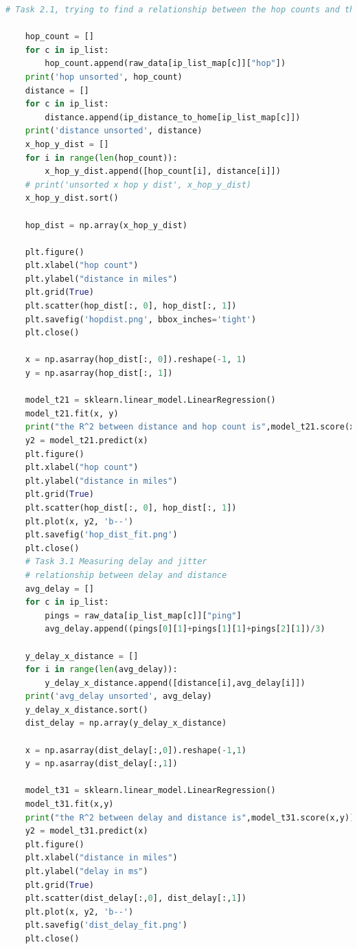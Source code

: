 \documentclass[paper=a4, fontsize=10pt]{scrartcl} %
\numberwithin{equation}{section} %
\numberwithin{figure}{section} %
\numberwithin{table}{section} %
\begin{document}
\begin{lstlisting}[language = python]
    # Task 2.1, trying to find a relationship between the hop counts and the geo distance
    
    hop_count = []
    for c in ip_list:
        hop_count.append(raw_data[ip_list_map[c]]["hop"])
    print('hop unsorted', hop_count)
    distance = []
    for c in ip_list:
        distance.append(ip_distance_to_home[ip_list_map[c]])
    print('distance unsorted', distance)
    x_hop_y_dist = []
    for i in range(len(hop_count)):
        x_hop_y_dist.append([hop_count[i], distance[i]])
    # print('unsorted x hop y dist', x_hop_y_dist)
    x_hop_y_dist.sort()
    
    hop_dist = np.array(x_hop_y_dist)
    
    plt.figure()
    plt.xlabel("hop count")
    plt.ylabel("distance in miles")
    plt.grid(True)
    plt.scatter(hop_dist[:, 0], hop_dist[:, 1])
    plt.savefig('hopdist.png', bbox_inches='tight')
    plt.close()
    
    x = np.asarray(hop_dist[:, 0]).reshape(-1, 1)
    y = np.asarray(hop_dist[:, 1])
    
    model_t21 = sklearn.linear_model.LinearRegression()
    model_t21.fit(x, y)
    print("the R^2 between distance and hop count is",model_t21.score(x, y))
    y2 = model_t21.predict(x)
    plt.figure()
    plt.xlabel("hop count")
    plt.ylabel("distance in miles")
    plt.grid(True)
    plt.scatter(hop_dist[:, 0], hop_dist[:, 1])
    plt.plot(x, y2, 'b--')
    plt.savefig('hop_dist_fit.png')
    plt.close()
    # Task 3.1 Measuring delay and jitter
    # relationship between delay and distance
    avg_delay = []
    for c in ip_list:
        pings = raw_data[ip_list_map[c]]["ping"]
        avg_delay.append((pings[0][1]+pings[1][1]+pings[2][1])/3)
    
    y_delay_x_distance = []
    for i in range(len(avg_delay)):
        y_delay_x_distance.append([distance[i],avg_delay[i]])
    print('avg_delay unsorted', avg_delay)
    y_delay_x_distance.sort()
    dist_delay = np.array(y_delay_x_distance)
    
    x = np.asarray(dist_delay[:,0]).reshape(-1,1)
    y = np.asarray(dist_delay[:,1])
    
    model_t31 = sklearn.linear_model.LinearRegression()
    model_t31.fit(x,y)
    print("the R^2 between delay and distance is",model_t31.score(x,y))
    y2 = model_t31.predict(x)
    plt.figure()
    plt.xlabel("distance in miles")
    plt.ylabel("delay in ms")
    plt.grid(True)
    plt.scatter(dist_delay[:,0], dist_delay[:,1])
    plt.plot(x, y2, 'b--')
    plt.savefig('dist_delay_fit.png')
    plt.close()
    

\end{lstlisting}
\end{document}
